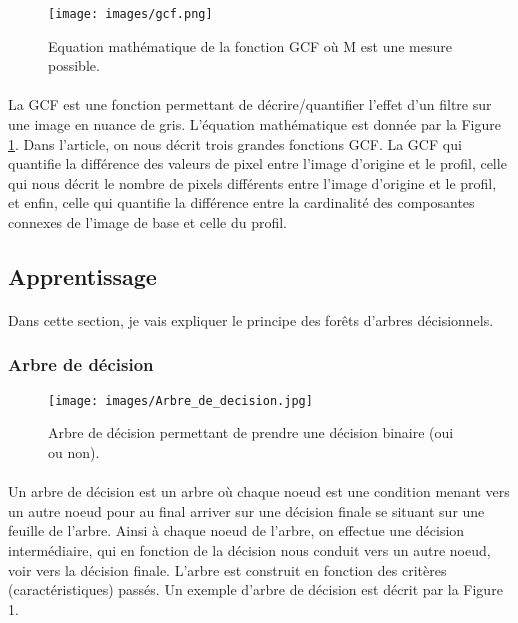 \documentclass[paper=a4, 11pt]{article}
\begin{document}
\begin{figure}[h]
\centering
\texttt{[image: images/gcf.png]}
\caption{Equation mathématique de la fonction GCF où M est une mesure possible.}
\label{fig:gcf}
\end{figure}

\paragraph{} La GCF est une fonction permettant de décrire/quantifier l'effet d'un filtre sur une image en nuance de gris. L'équation mathématique est donnée par la Figure \ref{fig:gcf}. Dans l'article\cite{article2}, on nous décrit trois grandes fonctions GCF. La GCF qui quantifie la différence des valeurs de pixel entre l'image d'origine et le profil, celle qui nous décrit le nombre de pixels différents entre l'image d'origine et le profil, et enfin, celle qui quantifie la différence entre la cardinalité des composantes connexes de l'image de base et celle du profil. 

\subsection{Apprentissage}
\paragraph{} Dans cette section, je vais expliquer le principe des forêts d'arbres décisionnels.

\subsubsection{Arbre de décision}
\begin{figure}[!h]
\centering
\texttt{[image: images/Arbre\_de\_decision.jpg]}
\caption{Arbre de décision permettant de prendre une décision binaire (oui ou non).}
\end{figure}

\paragraph{} Un arbre de décision est un arbre où chaque noeud est une condition menant vers un autre noeud pour au final arriver sur une décision finale se situant sur une feuille de l'arbre. Ainsi à chaque noeud de l'arbre, on effectue une décision intermédiaire, qui en fonction de la décision nous conduit vers un autre noeud, voir vers la décision finale. L'arbre est construit en fonction des critères (caractéristiques) passés. Un exemple d'arbre de décision est décrit par la Figure 1.
\end{document}
